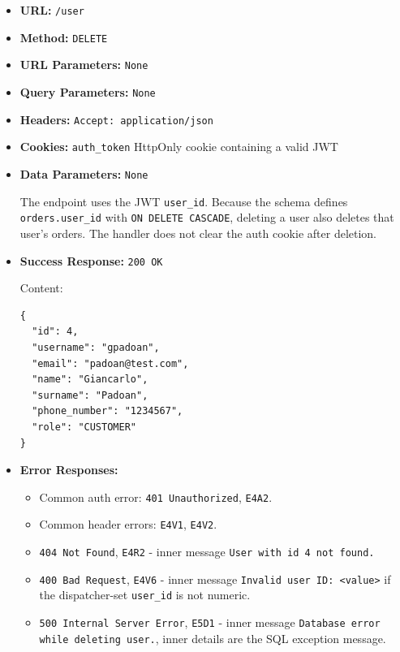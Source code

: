 \begin{itemize}[nosep]
\item \textbf{URL:} \texttt{/user}

\item \textbf{Method:} \texttt{DELETE}

\item \textbf{URL Parameters:} \texttt{None}

\item \textbf{Query Parameters:} \texttt{None}

\item \textbf{Headers:} \texttt{Accept: application/json}

\item \textbf{Cookies:} \texttt{auth\_token} HttpOnly cookie containing a valid JWT

\item \textbf{Data Parameters:} \texttt{None}

The endpoint uses the JWT \texttt{user\_id}. Because the schema defines \texttt{orders.user\_id} with \texttt{ON DELETE CASCADE}, deleting a user also deletes that user's orders. The handler does not clear the auth cookie after deletion.

\item \textbf{Success Response:} \texttt{200 OK}

Content:

\begin{lstlisting}
{
  "id": 4,
  "username": "gpadoan",
  "email": "padoan@test.com",
  "name": "Giancarlo",
  "surname": "Padoan",
  "phone_number": "1234567",
  "role": "CUSTOMER"
}
\end{lstlisting}

\item \textbf{Error Responses:}

\begin{itemize}[nosep]
\item Common auth error: \texttt{401 Unauthorized}, \texttt{E4A2}.
\item Common header errors: \texttt{E4V1}, \texttt{E4V2}.
\item \texttt{404 Not Found}, \texttt{E4R2} - inner message \texttt{User with id 4 not found.}
\item \texttt{400 Bad Request}, \texttt{E4V6} - inner message \texttt{Invalid user ID: <value>} if the dispatcher-set \texttt{user\_id} is not numeric.
\item \texttt{500 Internal Server Error}, \texttt{E5D1} - inner message \texttt{Database error while deleting user.}, inner details are the SQL exception message.
\end{itemize}

\end{itemize}

